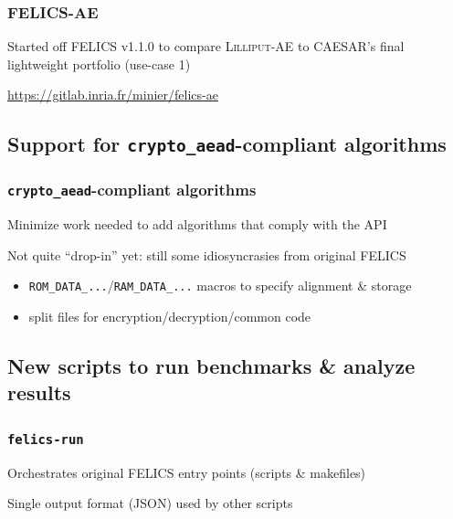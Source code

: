 \documentclass[english]{beamer}
\begin{document}
\begin{frame}
  \frametitle{FELICS-AE}

  Started off FELICS v1.1.0 to compare \textsc{Lilliput-AE} to CAESAR's final lightweight portfolio (use-case 1)

  {\url{https://gitlab.inria.fr/minier/felics-ae}}
\end{frame}

\subsection{Support for \texttt{crypto\_aead}-compliant algorithms}

\begin{frame}
  \frametitle{\texttt{crypto\_aead}-compliant algorithms}

  Minimize work needed to add algorithms that comply with the API


  Not quite ``drop-in'' yet: still some idiosyncrasies from original FELICS

  \begin{itemize}
  \item \texttt{ROM\_DATA\_...}/\texttt{RAM\_DATA\_...} macros to specify alignment \& storage
  \item split files for encryption/decryption/common code
  \end{itemize}

\end{frame}

\subsection{New scripts to run benchmarks \& analyze results}

\begin{frame}
  \frametitle{\texttt{felics-run}}

  Orchestrates original FELICS entry points (scripts \& makefiles)

  Single output format (JSON) used by other scripts

\end{frame}
\end{document}
